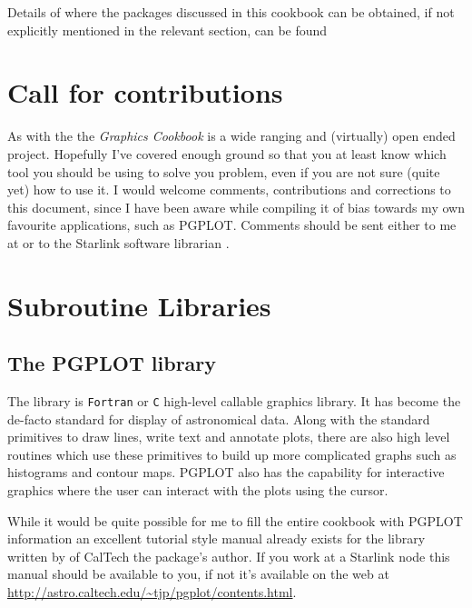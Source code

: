 \documentclass[twoside,11pt]{starlink}
\begin{document}
Details of where the packages discussed in this cookbook can be
obtained, if not explicitly mentioned in the relevant section, can be
found 



\section{Call for contributions\label{sc15_call}}

As with the  the \emph{Graphics Cookbook} is a wide ranging and
(virtually) open ended project. Hopefully I've covered enough ground
so that you at least know which tool you should be using to solve you
problem, even if you are not sure (quite yet) how to use it. I would
welcome comments, contributions and corrections to this document,
since I have been aware while compiling it of bias towards my own
favourite applications, such as PGPLOT. Comments should be sent either
to me at  or to the Starlink
software librarian .

\section{Subroutine Libraries\label{sc15_libraries}}

\subsection{The PGPLOT library\label{sc15_pgplot}}

The
library is \texttt{Fortran} or \texttt{C} high-level callable graphics
library. It has become the de-facto standard for display of
astronomical data. Along with the standard primitives to draw lines,
write text and annotate plots, there are also high level routines
which use these primitives to build up more complicated graphs such as
histograms and contour maps. PGPLOT also has the capability for
interactive graphics where the user can interact with the plots using
the cursor.

While it would be quite possible for me to fill the entire cookbook
with PGPLOT information an excellent tutorial style manual already
exists for the library written by  of CalTech the package's
author. If you work at a Starlink node this manual should be available
to you, if not it's available on the web at \url{http://astro.caltech.edu/~tjp/pgplot/contents.html}.
\end{document}
